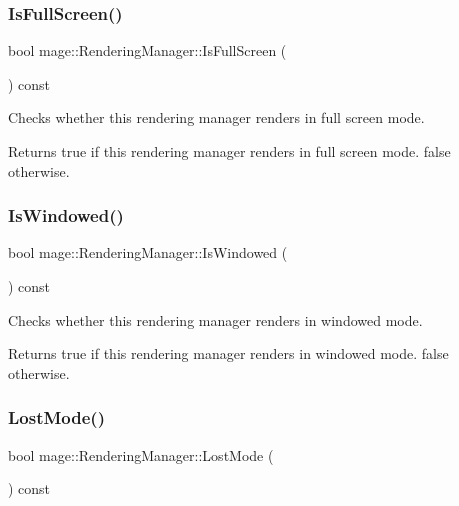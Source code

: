 \subsubsection{\texorpdfstring{Is\+Full\+Screen()}{IsFullScreen()}}
{\footnotesize\ttfamily bool mage\+::\+Rendering\+Manager\+::\+Is\+Full\+Screen (\begin{DoxyParamCaption}{ }\end{DoxyParamCaption}) const}

Checks whether this rendering manager renders in full screen mode.

\begin{DoxyReturn}{Returns}
{\ttfamily true} if this rendering manager renders in full screen mode. {\ttfamily false} otherwise. 
\end{DoxyReturn}
\hypertarget{classmage_1_1_rendering_manager_a33b320769fa67b9ea7daf387422fc3d4}{}\label{classmage_1_1_rendering_manager_a33b320769fa67b9ea7daf387422fc3d4} 
\subsubsection{\texorpdfstring{Is\+Windowed()}{IsWindowed()}}
{\footnotesize\ttfamily bool mage\+::\+Rendering\+Manager\+::\+Is\+Windowed (\begin{DoxyParamCaption}{ }\end{DoxyParamCaption}) const}

Checks whether this rendering manager renders in windowed mode.

\begin{DoxyReturn}{Returns}
{\ttfamily true} if this rendering manager renders in windowed mode. {\ttfamily false} otherwise. 
\end{DoxyReturn}
\hypertarget{classmage_1_1_rendering_manager_a046e763c36e64e87f3429e861308601e}{}\label{classmage_1_1_rendering_manager_a046e763c36e64e87f3429e861308601e} 
\subsubsection{\texorpdfstring{Lost\+Mode()}{LostMode()}}
{\footnotesize\ttfamily bool mage\+::\+Rendering\+Manager\+::\+Lost\+Mode (\begin{DoxyParamCaption}{ }\end{DoxyParamCaption}) const}

